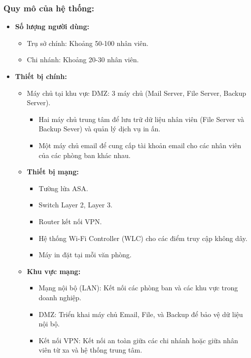 \documentclass[13pt]{article}
\begin{document}
\subsubsection{Quy mô của hệ thống:}
\begin{itemize}
    \item \textbf{Số lượng người dùng:}
    \begin{itemize}
        \item Trụ sở chính: Khoảng 50-100 nhân viên.
        \item Chi nhánh: Khoảng 20-30 nhân viên.
    \end{itemize}
    \item \textbf{Thiết bị chính:}
    \begin{itemize}
        \item Máy chủ tại khu vực DMZ: 3 máy chủ (Mail Server, File Server, Backup Server).
        \begin{itemize}
            \item Hai máy chủ trung tâm để lưu trữ dữ liệu nhân viên (File Server và Backup Sever) và quản lý dịch vụ in ấn.
            \item Một máy chủ email để cung cấp tài khoản email cho các nhân viên của các phòng ban khác nhau.
        \end{itemize}
        \item \textbf{Thiết bị mạng:}
        \begin{itemize}
            \item Tường lửa ASA.
            \item Switch Layer 2, Layer 3.
            \item Router kết nối VPN.
            \item Hệ thống Wi-Fi Controller (WLC) cho các điểm truy cập không dây.
            \item Máy in đặt tại mỗi văn phòng.
        \end{itemize}
        \item \textbf{Khu vực mạng:}
        \begin{itemize}
            \item Mạng nội bộ (LAN): Kết nối các phòng ban và các khu vực trong doanh nghiệp.
            \item DMZ: Triển khai máy chủ Email, File, và Backup để bảo vệ dữ liệu nội bộ.
            \item Kết nối VPN: Kết nối an toàn giữa các chi nhánh hoặc giữa nhân viên từ xa và hệ thống trung tâm.
        \end{itemize}
    \end{itemize}
\end{itemize}
\end{document}
